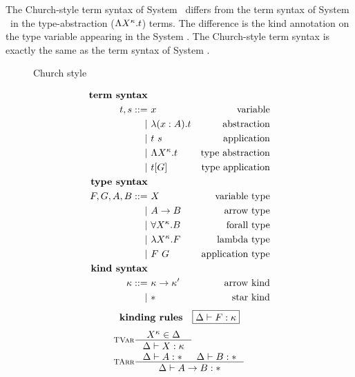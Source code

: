 The Church-style term syntax of System \Fw\ differs from the term syntax of
System \F\ in the type-abstraction ($\Lambda X^\kappa.t$) terms. The difference is
the kind annotation on the type variable appearing in the System \Fw.
The Church-style term syntax is exactly the same as the term syntax of
System \F.

\begin{figure}
\begin{singlespace}
\begin{minipage}{.46\textwidth}
        \begin{center}Church style\end{center}\vspace*{-1em}
\def\baselinestretch{0}
\small
\begin{align*}
\textbf{term syntax} \\
t,s ::= &~ x               & \text{variable}    \\
      | &~ \lambda(x:A) . t     & \text{abstraction} \\
      | &~ t ~ s           & \text{application} \\
      | &~ \Lambda X^\kappa . t & \text{type abstraction} \\
      | &~ t [G]           & \text{type application} \\
\textbf{type syntax} \\
F,G,A,B ::= &~ X                  & \text{variable type} \\
          | &~ A -> B             & \text{arrow type} \\
          | &~ \forall X^\kappa.B & \text{forall type}   \\
          | &~ \lambda X^\kappa.F      & \text{lambda type}   \\
          | &~ F ~ G              & \text{application type}   \\
\textbf{kind syntax} \\
\kappa ::= &~ \kappa -> \kappa' & \text{arrow kind} \\
         | &~ *                 & \text{star kind}   \\
\end{align*}
\[ \textbf{kinding rules} \quad \framebox{$ \Delta |- F:\kappa $} \]\vspace*{-1em}
\begin{align*}
& \inference[\sc TVar]{X^\kappa \in \Delta}{\Delta |- X:\kappa} \\
& \inference[\sc TArr]{\Delta |- A:* & \Delta |- B:*}{\Delta |- A -> B:*} \\

\end{align*}
\end{minipage}
\end{singlespace}
\end{figure}
